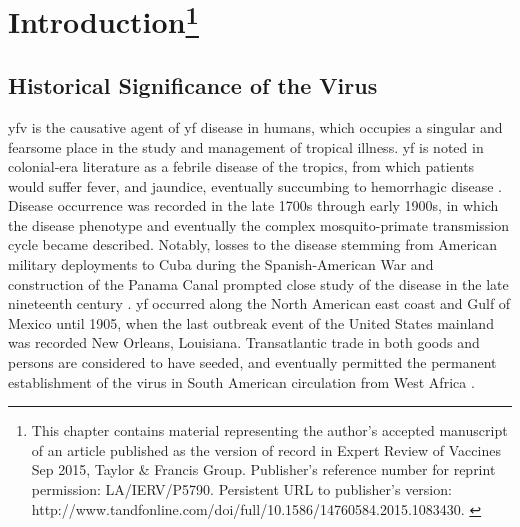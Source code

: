\chapter[Introduction]{Introduction\footnote{This chapter contains material representing the author's accepted manuscript of an article published as the version of record in Expert Review of Vaccines  Sep 2015, Taylor \& Francis Group. Publisher's reference number for reprint permission: LA/IERV/P5790. Persistent URL to publisher's version: http://www.tandfonline.com/doi/full/10.1586/14760584.2015.1083430. \parencite{Beck:2015eu}}}

\section{Historical Significance of the Virus}
\Gls{yfv} is the causative agent of \gls{yf} disease in humans, which occupies a singular and fearsome place in the study and management of tropical illness. \Gls{yf} is noted in colonial-era literature as a febrile disease of the tropics, from which patients would suffer fever, and jaundice, eventually succumbing to hemorrhagic disease \parencite{Vainio:1998wy}. Disease occurrence was recorded in the late 1700s through early 1900s, in which the disease phenotype and eventually the complex mosquito-primate transmission cycle became described. Notably, losses to the disease stemming from American military deployments to Cuba during the Spanish-American War and construction of the Panama Canal prompted close study of the disease in the late nineteenth century \parencite{Bazin:2011vi}. \Gls{yf} occurred along the North American east coast and Gulf of Mexico until 1905, when the last outbreak event of the United States mainland was recorded New Orleans, Louisiana. Transatlantic trade in both goods and persons are considered to have seeded, and eventually permitted the permanent establishment of the virus in South American circulation from West Africa \parencite{Bryant:2007kx}.

